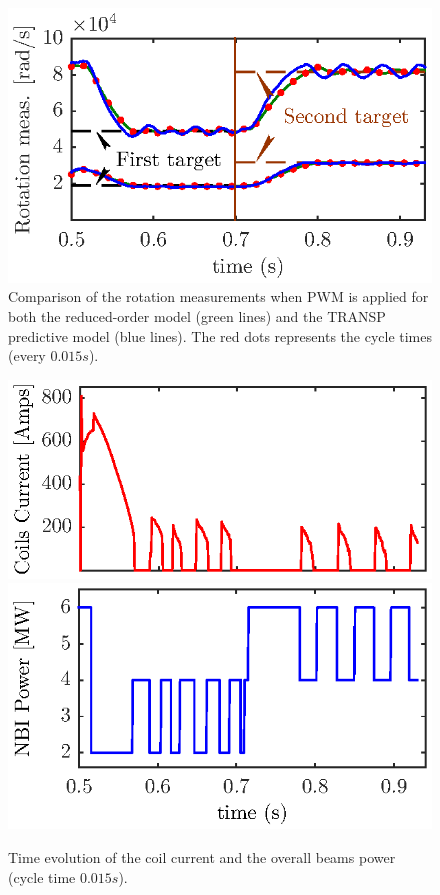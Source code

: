 \documentclass{iopart}
\begin{document}
\begin{figure}
	\centering
	\includegraphics{fig15} %
	\caption{Comparison of the rotation measurements when PWM is applied for both the reduced-order model (green lines) and the TRANSP predictive model (blue lines). The red dots represents the cycle times (every $0.015 s$).}
	\label{fig:rot14}
\end{figure}

\begin{figure}
	\centering
	\includegraphics{fig16a}  \\[-0.5em] %
	\includegraphics{fig16b} 
	\caption{Time evolution of the coil current and the overall beams power (cycle time $0.015  s$).}
	\label{fig:rot15}
\end{figure}
\end{document}
